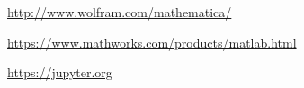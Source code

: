 \documentclass[nobib,nofonts,nols,nohyper]{tufte-handout}
\begin{document}
\begin{description}
	\url{http://www.wolfram.com/mathematica/}
	
	\url{https://www.mathworks.com/products/matlab.html}
	
	\url{https://jupyter.org}
	
\end{description}

\nocite{*}
\printbibliography[category=cited]%

\printbibliography[%
  title={Further Reading},%
  resetnumbers,%
  omitnumbers,%
	notcategory=cited,%
	]
\end{document}
